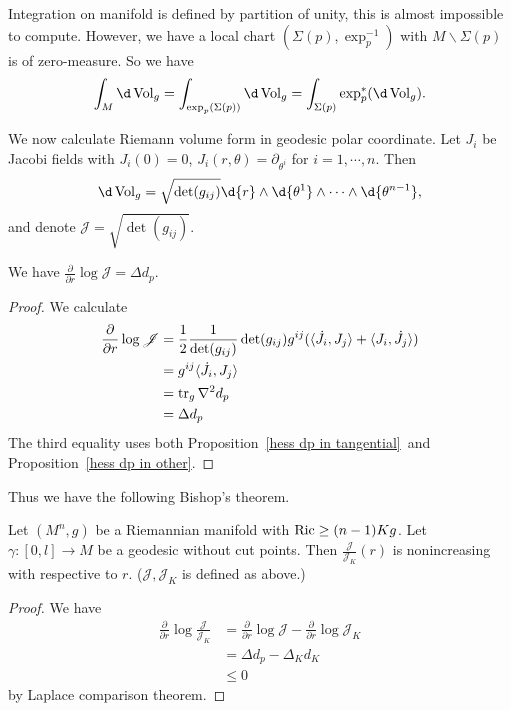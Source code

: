 Integration on manifold is defined by partition of unity, this is almost impossible to compute.
However, we have a local chart $(\Sigma(p),\exp_p^{-1})$ with $M\backslash\Sigma(p)$ is of zero-measure.
So we have
\[\int_M\d\Vol_g=\int_{\exp_p(\Sigma(p))}\d\Vol_g=\int_{\Sigma(p)}\exp_p^*(\d\Vol_g).\]

We now calculate Riemann volume form in geodesic polar coordinate.
Let $J_i$ be Jacobi fields with $J_i(0)=0$, $J_i(r,\theta)=\partial_{\theta^i}$ for $i=1,\cdots,n$.
Then
\[\d\Vol_g=\sqrt{\det(g_{ij})}\d{r}\wedge\d{\theta^1}\wedge\cdots\wedge\d{\theta^{n-1}},\]
and denote $\mathscr{J}=\sqrt{\det(g_{ij})}$.

\begin{prop}
    We have $\frac{\partial{}}{\partial{r}}\log\mathscr{J}=\Delta d_p$.
\end{prop}
\begin{proof}
    We calculate
    \begin{align*}
        \frac{\partial{}}{\partial{r}}\log\mathscr{J}&=\frac{1}{2}\frac{1}{\det(g_{ij})}\det(g_{ij})g^{ij}(\langle\dot{J}_i,J_j\rangle+\langle J_i,\dot{J_j}\rangle)\\
        &=g^{ij}\langle\dot{J}_i,J_j\rangle\\
        &=\operatorname{tr}_g\nabla^2 d_p\\
        &=\Delta d_p
    \end{align*}
    The third equality uses both Proposition~\ref{hess dp in tangential}~and Proposition~\ref{hess dp in other}.
\end{proof}

Thus we have the following Bishop's theorem.
\begin{thm}[Bishop]\label{Bishop}
    Let $(M^n,g)$ be a Riemannian manifold with $\operatorname{Ric}\geq(n-1)Kg$.
    Let $\gamma:[0,l]\to M$ be a geodesic without cut points.
    Then $\frac{\mathscr{J}}{\mathscr{J}_K}(r)$ is nonincreasing with respective to $r$.
    ($\mathscr{J},\mathscr{J}_K$ is defined as above.)
\end{thm}
\begin{proof}
    We have
    \begin{align*}
        \frac{\partial{}}{\partial{r}}\log\frac{\mathscr{J}}{\mathscr{J}_K}&=\frac{\partial{}}{\partial{r}}\log\mathscr{J}-\frac{\partial{}}{\partial{r}}\log\mathscr{J}_K\\
        &=\Delta d_p-\Delta_Kd_K\\
        &\leq 0
    \end{align*}
    by Laplace comparison theorem.
\end{proof}

